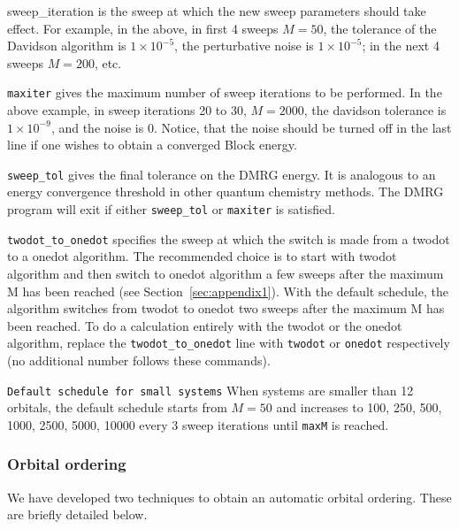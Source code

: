 \documentclass[letterpaper,12pt,aps, pra]{revtex4-1}
\begin{document}
sweep\_iteration is the sweep at which the new sweep parameters should take
effect. For example, in the above, in  first 4 sweeps $M=50$, the tolerance of
the Davidson algorithm is $1\times 10^{-5}$, the perturbative  noise is $1
\times 10^{-5}$; in the next 4 sweeps $M=200$, etc.

\texttt{maxiter} gives the maximum number of sweep iterations to be performed.
In the above example, in sweep iterations 20 to 30, $M=2000$, the davidson
tolerance is $1\times 10^{-9}$, and the noise is 0. Notice, that the noise
should be turned off in the last line if one wishes to obtain a converged Block
energy.

\texttt{sweep\_tol} gives the final tolerance on the DMRG energy. It is
analogous to an energy convergence threshold in other quantum chemistry
methods.  The DMRG program will exit if either \texttt{sweep\_tol} or
\texttt{maxiter} is satisfied.

\texttt{twodot\_to\_onedot} specifies the sweep at which the switch is made
from a twodot to a onedot algorithm. The recommended choice is to start with
twodot algorithm and then switch to onedot algorithm a few sweeps after the
maximum M has been reached (see Section~\ref{sec:appendix1}).  With the default
schedule, the algorithm switches from twodot to onedot two sweeps after the
maximum M has been reached.  To do a calculation entirely with the twodot or
the onedot algorithm, replace the \texttt{twodot\_to\_onedot} line with
\texttt{twodot} or \texttt{onedot} respectively (no additional number follows
these commands). 

\texttt{Default schedule for small systems} When systems are smaller than 12 orbitals, the default schedule starts from $M=50$ and increases to 100, 250, 500, 1000, 2500, 5000, 10000 every 3 sweep iterations until \texttt{maxM} is reached.

\subsubsection{Orbital ordering}

We have developed two techniques to obtain
an automatic orbital ordering. These are briefly detailed below. 
\end{document}
